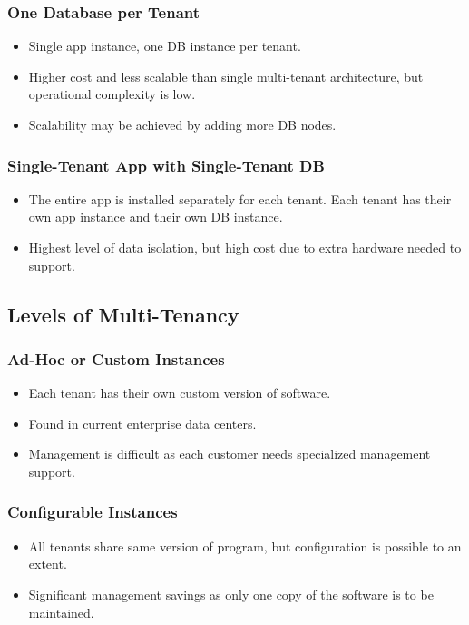 \documentclass{article}
\begin{document}
\subsubsection{One Database per Tenant}
\begin{itemize}
    \item Single app instance, one DB instance per tenant. 
    
    \item Higher cost and less scalable than single multi-tenant architecture, but operational complexity is low.
    
    \item Scalability may be achieved by adding more DB nodes.
\end{itemize}

\subsubsection{Single-Tenant App with Single-Tenant DB}
\begin{itemize}
    \item The entire app is installed separately for each tenant. Each tenant has their own app instance and their own DB instance. 
    
    \item Highest level of data isolation, but high cost due to extra hardware needed to support.
\end{itemize}

\subsection{Levels of Multi-Tenancy}
\subsubsection{Ad-Hoc or Custom Instances}
\begin{itemize}
    \item Each tenant has their own custom version of software. 
    
    \item Found in current enterprise data centers. 
    
    \item Management is difficult as each customer needs specialized management support.
\end{itemize}

\subsubsection{Configurable Instances}
\begin{itemize}
    \item All tenants share same version of program, but configuration is possible to an extent. 
    
    \item Significant management savings as only one copy of the software is to be maintained.
\end{itemize}
\end{document}
